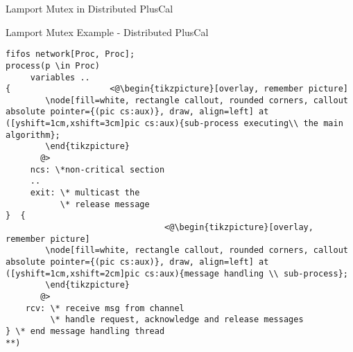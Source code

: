 \documentclass{beamer}
\begin{document}
\begin{frame}[fragile]{Lamport Mutex in Distributed PlusCal}
\begin{exampleblock}{Lamport Mutex Example - Distributed PlusCal}
\begin{lstlisting}[language=pluscal, frame = none, numbers = none]
fifos network[Proc, Proc];
process(p \in Proc)
     variables ..
{                    <@\begin{tikzpicture}[overlay, remember picture]
        \node[fill=white, rectangle callout, rounded corners, callout absolute pointer={(pic cs:aux)}, draw, align=left] at ([yshift=1cm,xshift=3cm]pic cs:aux){sub-process executing\\ the main algorithm};
        \end{tikzpicture}
       @>
     ncs: \*non-critical section
     .. 
     exit: \* multicast the
           \* release message 
}  {
                                <@\begin{tikzpicture}[overlay, remember picture]
        \node[fill=white, rectangle callout, rounded corners, callout absolute pointer={(pic cs:aux)}, draw, align=left] at ([yshift=1cm,xshift=2cm]pic cs:aux){message handling \\ sub-process};
        \end{tikzpicture}
       @>
    rcv: \* receive msg from channel
         \* handle request, acknowledge and release messages
} \* end message handling thread
**)
\end{lstlisting}
\end{exampleblock}
\end{frame}
\end{document}
